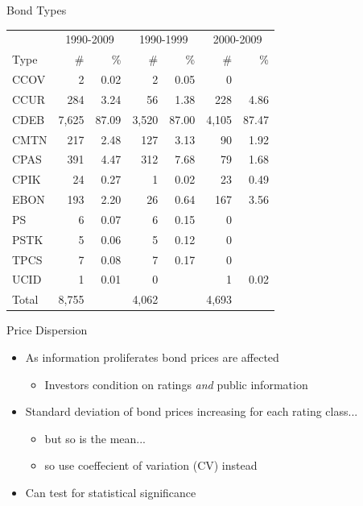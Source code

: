 \documentclass{beamer}
\begin{document}
\begin{frame}{Bond Types}

\begin{table}[htbp]\centering 
\begin{tabular} {@{} l *{6}r @{}} \\ \toprule
 & \multicolumn{2}{c}{1990-2009} & \multicolumn{2}{c}{1990-1999} & \multicolumn{2}{c}{2000-2009} \\
 \cmidrule(r){2-3} \cmidrule(r){4-5} \cmidrule(r){6-7}
Type  & \# & \% & \# & \% & \# & \% \\ \midrule
CCOV  & 2     & 0.02  & 2     & 0.05    & 0     &  \\ 
CCUR  & 284   & 3.24  & 56    & 1.38    & 228   & 4.86\\ 
CDEB  & 7,625 & 87.09 & 3,520 & 87.00   & 4,105 & 87.47\\ 
CMTN  & 217   & 2.48  & 127   & 3.13    & 90    & 1.92\\ 
CPAS  & 391   & 4.47  & 312   & 7.68    & 79    & 1.68\\ 
CPIK  & 24    & 0.27  & 1     & 0.02    & 23    & 0.49\\ 
EBON  & 193   & 2.20  & 26    & 0.64    & 167   & 3.56\\ 
PS    & 6     & 0.07  & 6     & 0.15    & 0     &  \\ 
PSTK  & 5     & 0.06  & 5     & 0.12    & 0     &  \\ 
TPCS  & 7     & 0.08  & 7     & 0.17    & 0     &  \\ 
UCID  & 1     & 0.01  & 0     &         & 1     & 0.02\\ \midrule
Total & 8,755 &       & 4,062 &         & 4,693 & \\ 
\bottomrule
\end{tabular}
\end{table}
\end{frame}


\begin{frame}{Price Dispersion}
\begin{itemize}
	\item As information proliferates bond prices are affected
	\begin{itemize}
		\item Investors condition on ratings \textit{and} public information
	\end{itemize}
	\item Standard deviation of bond prices increasing for each rating class...
	\begin{itemize}
		\item but so is the mean...
		\item so use coeffecient of variation (CV) instead
	\end{itemize}
	\item Can test for statistical significance
\end{itemize}
\end{frame}
\end{document}
